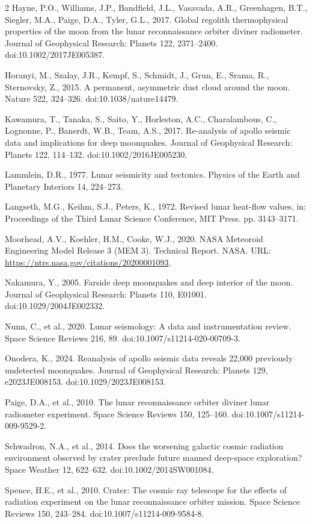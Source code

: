 \begin{multicols}{2}
Hayne, P.O., Williams, J.P., Bandfield, J.L., Vasavada, A.R., Greenhagen, B.T., Siegler, M.A., Paige, D.A., Tyler, G.L., 2017. Global regolith thermophysical properties of the moon from the lunar reconnaissance orbiter diviner radiometer. Journal of Geophysical Research: Planets 122, 2371--2400. doi:10.1002/2017JE005387.

Horanyi, M., Szalay, J.R., Kempf, S., Schmidt, J., Grun, E., Srama, R., Sternovsky, Z., 2015. A permanent, asymmetric dust cloud around the moon. Nature 522, 324--326. doi:10.1038/nature14479.

Kawamura, T., Tanaka, S., Saito, Y., Horleston, A.C., Charalambous, C., Lognonne, P., Banerdt, W.B., Team, A.S., 2017. Re-analysis of apollo seismic data and implications for deep moonquakes. Journal of Geophysical Research: Planets 122, 114--132. doi:10.1002/2016JE005230.

Lammlein, D.R., 1977. Lunar seismicity and tectonics. Physics of the Earth and Planetary Interiors 14, 224--273.

Langseth, M.G., Keihm, S.J., Peters, K., 1972. Revised lunar heat-flow values, in: Proceedings of the Third Lunar Science Conference, MIT Press. pp. 3143--3171.

Moorhead, A.V., Koehler, H.M., Cooke, W.J., 2020. NASA Meteoroid Engineering Model Release 3 (MEM 3). Technical Report. NASA. URL: \url{https://ntrs.nasa.gov/citations/20200001093}.

Nakamura, Y., 2005. Farside deep moonquakes and deep interior of the moon. Journal of Geophysical Research: Planets 110, E01001. doi:10.1029/2004JE002332.

Nunn, C., et al., 2020. Lunar seismology: A data and instrumentation review. Space Science Reviews 216, 89. doi:10.1007/s11214-020-00709-3.

Onodera, K., 2024. Reanalysis of apollo seismic data reveals 22,000 previously undetected moonquakes. Journal of Geophysical Research: Planets 129, e2023JE008153. doi:10.1029/2023JE008153.

Paige, D.A., et al., 2010. The lunar reconnaissance orbiter diviner lunar radiometer experiment. Space Science Reviews 150, 125--160. doi:10.1007/s11214-009-9529-2.

Schwadron, N.A., et al., 2014. Does the worsening galactic cosmic radiation environment observed by crater preclude future manned deep-space exploration? Space Weather 12, 622--632. doi:10.1002/2014SW001084.

Spence, H.E., et al., 2010. Crater: The cosmic ray telescope for the effects of radiation experiment on the lunar reconnaissance orbiter mission. Space Science Reviews 150, 243--284. doi:10.1007/s11214-009-9584-8.


\end{multicols}
